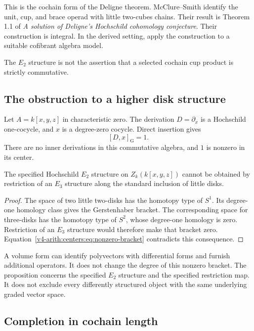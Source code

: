 This is the cochain form of the Deligne theorem. McClure--Smith identify the unit, cup, and brace operad
with little two-cubes chains. Their result is Theorem 1.1 of
\emph{A solution of Deligne's Hochschild cohomology conjecture}. Their construction is integral. In the
derived setting, apply the construction to a suitable
cofibrant algebra model.

The $E_2$ structure is not the assertion that a selected
cochain cup product is strictly commutative.

\subsection{The obstruction to a higher disk structure}

Let $A=k[x,y,z]$ in characteristic zero. The derivation
$D=\partial_x$ is a Hochschild one-cocycle, and $x$ is a
degree-zero cocycle. Direct insertion gives
\begin{equation}\label{v4-arith:centers:eq:nonzero-bracket}
 [D,x]_{\mathrm G}=1.
\end{equation}
There are no inner derivations in this commutative algebra,
and $1$ is nonzero in its center.

\begin{proposition}
\label{v4-arith:centers:prop:no-e3}
The specified Hochschild $E_2$ structure on $Z_k(k[x,y,z])$
cannot be obtained by restriction of an $E_3$ structure
along the standard inclusion of little disks.
\end{proposition}

\begin{proof}
The space of two little two-disks has the homotopy type
of $S^1$. Its degree-one homology class gives the
Gerstenhaber bracket. The corresponding space for
three-disks has the homotopy type of $S^2$, whose
degree-one homology is zero. Restriction of an $E_3$
structure would therefore make that bracket zero.
Equation~\eqref{v4-arith:centers:eq:nonzero-bracket}
contradicts this consequence.
\end{proof}

A volume form can identify polyvectors with differential
forms and furnish additional operators. It does not change
the degree of this nonzero bracket. The proposition concerns
the specified $E_2$ structure and the specified restriction
map. It does not exclude every differently structured
object with the same underlying graded vector space.

\subsection{Completion in cochain length}

